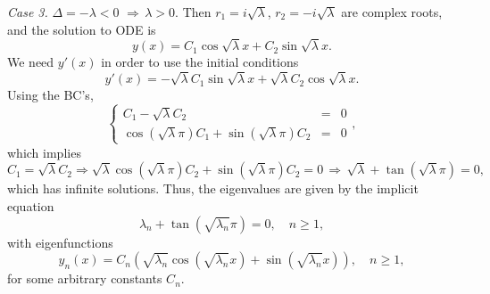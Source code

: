 \documentclass[11pt]{article}
\begin{document}
\begin{solution}
\par \textsl{Case 3.} $\Delta = -\lambda <0 \,\, \Rightarrow \, \lambda>0.$ Then $r_{1}=i\sqrt{\lambda}$, $r_{2}=-i\sqrt{\lambda}$ are complex roots, and the solution to ODE is
\[y(x)=C_{1}\cos\sqrt{\lambda}x+C_{2}\sin\sqrt{\lambda}x.\]
We need $y'(x)$ in order to use the initial conditions
\[y'(x)=-\sqrt{\lambda}C_{1}\sin\sqrt{\lambda}x+\sqrt{\lambda}C_{2}\cos\sqrt{\lambda}x.\]
Using the BC's,
\begin{equation*}
\left\{\begin{array}{rcl}
       C_{1}-\sqrt{\lambda}C_{2}  & = & 0\\
       \cos(\sqrt{\lambda}\pi)C_{1} + \sin(\sqrt{\lambda}\pi)C_{2}&=&0
      \end{array}\right. ,
\end{equation*}
which implies 
\[C_{1}=\sqrt{\lambda}C_{2}\Rightarrow \sqrt{\lambda}\cos(\sqrt{\lambda}\pi)C_{2}+\sin(\sqrt{\lambda}\pi)C_{2}=0 \,\Rightarrow\, \sqrt{\lambda} + \tan(\sqrt{\lambda}\pi)=0,\]
which has infinite solutions. Thus, the eigenvalues are given by the implicit equation
\[\boxed{\lambda_{n}+ \tan\left(\sqrt{\lambda_{n}}\pi\right)=0}, \quad n\geq 1,\]
with eigenfunctions
\[\boxed{y_{n}(x)=C_{n}\left(\sqrt{\lambda_{n}}\cos \left(\sqrt{\lambda_{n}}x\right)+ \sin \left(\sqrt{\lambda_{n}}x\right)\right)}, \quad n\geq 1,\]
for some arbitrary constants $C_{n}$.
\end{solution}
\end{document}
